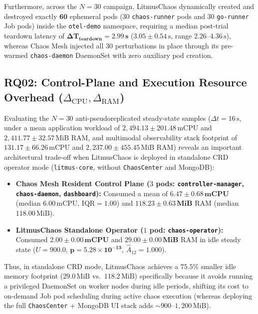 Furthermore, across the $N=30$ campaign, LitmusChaos dynamically created and destroyed exactly $\mathbf{60}$ ephemeral pods ($30$ \texttt{chaos-runner} pods and $30$ \texttt{go-runner} Job pods) inside the \texttt{otel-demo} namespace, requiring a median post-trial teardown latency of $\mathbf{\Delta T_{\text{teardown}} = 2.99\,\text{s}}$ ($3.05 \pm 0.54\,\text{s}$, range $2.26\text{--}4.36\,\text{s}$), whereas Chaos Mesh injected all $30$ perturbations in place through its pre-warmed \texttt{chaos-daemon} DaemonSet with zero auxiliary pod creation.

\subsection{RQ02: Control-Plane and Execution Resource Overhead ($\Delta_{\text{CPU}}, \Delta_{\text{RAM}}$)}
Evaluating the $N=30$ anti-pseudoreplicated steady-state samples ($\Delta t = 16\,\text{s}$, under a mean application workload of $2{,}494.13 \pm 201.48\,\text{mCPU}$ and $2{,}411.77 \pm 32.57\,\text{MiB}$ RAM, and multimodal observability stack footprint of $131.17 \pm 66.26\,\text{mCPU}$ and $2{,}237.00 \pm 455.45\,\text{MiB}$ RAM) reveals an important architectural trade-off when LitmusChaos is deployed in standalone CRD operator mode (\texttt{litmus-core}, without \texttt{ChaosCenter} and MongoDB):
\begin{itemize}
    \item \textbf{Chaos Mesh Resident Control Plane ($3$ pods: \texttt{controller-manager}, \texttt{chaos-daemon}, \texttt{dashboard}):} Consumed a mean of $\mathbf{6.47 \pm 0.68\,\text{mCPU}}$ (median $6.00\,\text{mCPU}$, $\text{IQR} = 1.00$) and $\mathbf{118.23 \pm 0.63\,\text{MiB}}$ RAM (median $118.00\,\text{MiB}$).
    \item \textbf{LitmusChaos Standalone Operator ($1$ pod: \texttt{chaos-operator}):} Consumed $\mathbf{2.00 \pm 0.00\,\text{mCPU}}$ and $\mathbf{29.00 \pm 0.00\,\text{MiB}}$ RAM in idle steady state ($U = 900.0$, $\mathbf{p = 5.28 \times 10^{-13}}$, $\hat{A}_{12} = 1.000$).
\end{itemize}
Thus, in standalone CRD mode, LitmusChaos achieves a $75.5\%$ smaller idle memory footprint ($29.0\,\text{MiB}$ vs.\ $118.2\,\text{MiB}$) specifically because it avoids running a privileged DaemonSet on worker nodes during idle periods, shifting its cost to on-demand Job pod scheduling during active chaos execution (whereas deploying the full \texttt{ChaosCenter} + MongoDB UI stack adds $\sim 900\text{--}1{,}200\,\text{MiB}$).

